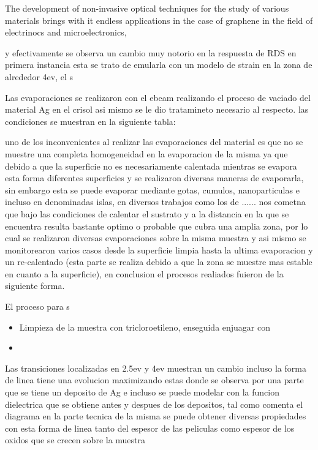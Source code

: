 The development of non-invasive optical techniques for the study of various materials brings with it endless applications in the case of graphene in the field of electrinocs and microelectronics, 



y efectivamente se observa un cambio muy notorio en la respuesta de RDS en primera instancia esta se trato de emularla con un modelo de strain en la zona 
de alrededor 4ev, el s

Las evaporaciones se realizaron con el ebeam realizando el proceso de vaciado del material Ag en el crisol asi mismo se le dio tratamineto necesario al respecto. las condiciones se muestran en la siguiente tabla: 


uno de los inconvenientes al realizar las evaporaciones del material es que no se muestre una completa homogeneidad en la evaporacion de la misma ya que debido a que la superficie no es necesariamente calentada mientras se evapora esta forma diferentes superficies  y se realizaron diversas maneras de evaporarla, sin embargo esta se puede evaporar mediante gotas, cumulos, nanoparticulas e incluso en denominadas islas, en diversos trabajos como los de ...... nos cometna que bajo las condiciones de calentar el sustrato y a la distancia en la que se encuentra resulta bastante optimo o probable que cubra una amplia zona, por lo cual se realizaron diversas evaporaciones sobre la misma muestra y asi mismo se monitorearon varios casos desde la superficie limpia hasta la ultima evaporacion  y un re-calentado (esta parte se realiza debido a que la zona se muestre mas estable en cuanto a la superficie), en conclusion el procesos realiados fuieron de la siguiente forma. 

El proceso para s

\begin{itemize}
	\item Limpieza de la muestra con tricloroetileno, enseguida enjuagar con 
	\item 
\end{itemize}
Las transiciones localizadas en 2.5ev y 4ev muestran un cambio incluso la forma de linea tiene una evolucion maximizando estas donde se observa por una parte que se tiene un deposito de Ag e incluso se puede modelar con la funcion dielectrica que se obtiene antes y despues de los depositos, tal como comenta el diagrama en la parte tecnica de la misma se puede obtener diversas propiedades con esta forma de linea tanto del espesor de las peliculas como espesor de los oxidos que se crecen sobre la muestra


